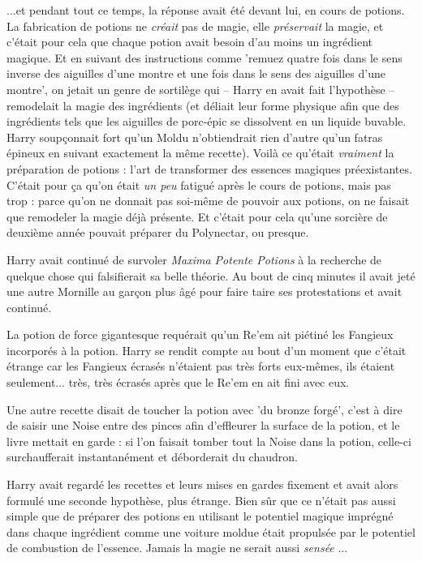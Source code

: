 ...et pendant tout ce temps, la réponse avait été devant lui, en cours de potions. La fabrication de potions ne \emph{créait } pas de magie, elle \emph{préservait}  la magie, et c'était pour cela que chaque potion avait besoin d'au moins un ingrédient magique. Et en suivant des instructions comme 'remuez quatre fois dans le sens inverse des aiguilles d'une montre et une fois dans le sens des aiguilles d'une montre', on jetait un genre de sortilège qui – Harry en avait fait l'hypothèse – remodelait la magie des ingrédients (et déliait leur forme physique afin que des ingrédients tels que les aiguilles de porc-épic se dissolvent en un liquide buvable. Harry soupçonnait fort qu'un Moldu n'obtiendrait rien d'autre qu'un fatras épineux en suivant exactement la même recette). Voilà ce qu'était \emph{vraiment}  la préparation de potions : l'art de transformer des essences magiques préexistantes. C'était pour ça qu'on était \emph{un peu}  fatigué après le cours de potions, mais pas trop : parce qu'on ne donnait pas soi-même de pouvoir aux potions, on ne faisait que remodeler la magie déjà présente. Et c'était pour cela qu'une sorcière de deuxième année pouvait préparer du Polynectar, ou presque.

Harry avait continué de survoler \emph{Maxima Potente Potions}  à la recherche de quelque chose qui falsifierait sa belle théorie. Au bout de cinq minutes il avait jeté une autre Mornille au garçon plus âgé pour faire taire ses protestations et avait continué.

La potion de force gigantesque requérait qu'un Re'em ait piétiné les Fangieux incorporés à la potion. Harry se rendit compte au bout d'un moment que c'était étrange car les Fangieux écrasés n'étaient pas très forts eux-mêmes, ils étaient seulement... très, très écrasés après que le Re'em en ait fini avec eux.

Une autre recette disait de toucher la potion avec 'du bronze forgé', c'est à dire de saisir une Noise entre des pinces afin d'effleurer la surface de la potion, et le livre mettait en garde : si l'on faisait tomber tout la Noise dans la potion, celle-ci surchaufferait instantanément et déborderait du chaudron.

Harry avait regardé les recettes et leurs mises en gardes fixement et avait alors formulé une seconde hypothèse, plus étrange. Bien sûr que ce n'était pas aussi simple que de préparer des potions en utilisant le potentiel magique imprégné dans chaque ingrédient comme une voiture moldue était propulsée par le potentiel de combustion de l'essence. Jamais la magie ne serait aussi \emph{sensée} ...

